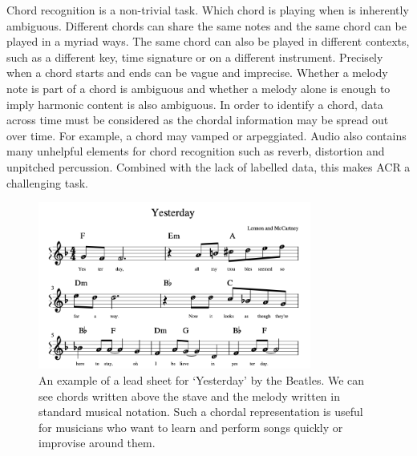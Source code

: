 Chord recognition is a non-trivial task. Which chord is playing when is inherently ambiguous. Different chords can share the same notes and the same chord can be played in a myriad ways. The same chord can also be played in different contexts, such as a different key, time signature or on a different instrument. Precisely when a chord starts and ends can be vague and imprecise. Whether a melody note is part of a chord is ambiguous and whether a melody alone is enough to imply harmonic content is also ambiguous. In order to identify a chord, data across time must be considered as the chordal information may be spread out over time. For example, a chord may vamped or arpeggiated. Audio also contains many unhelpful elements for chord recognition such as reverb, distortion and unpitched percussion. Combined with the lack of labelled data, this makes ACR a challenging task.

\begin{figure}[H]
    \centering
    \includegraphics[width=0.8\textwidth]{figures/lead_sheet_example.png}
    \caption{An example of a lead sheet for `Yesterday' by the Beatles. We can see chords written above the stave and the melody written in standard musical notation. Such a chordal representation is useful for musicians who want to learn and perform songs quickly or improvise around them.}\label{fig:lead_sheet_example}
\end{figure}


